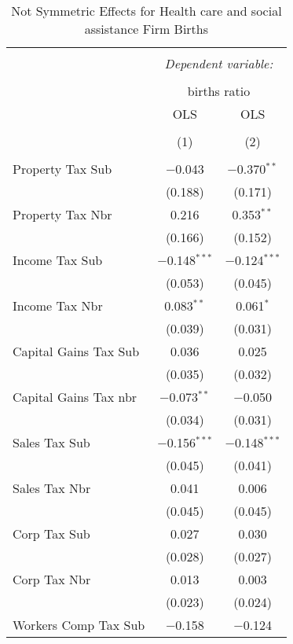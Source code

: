 
\begin{table}[!htbp] \centering 
  \caption{Not Symmetric Effects for  Health care and social assistance Firm Births} 
  \label{62noequality} 
\footnotesize 
\begin{tabular}{@{\extracolsep{5pt}}lcc} 
\\[-1.8ex]\hline 
\hline \\[-1.8ex] 
 & \multicolumn{2}{c}{\textit{Dependent variable:}} \\ 
\cline{2-3} 
\\[-1.8ex] & \multicolumn{2}{c}{births ratio} \\ 
 & OLS & OLS \\ 
\\[-1.8ex] & (1) & (2)\\ 
\hline \\[-1.8ex] 
 Property Tax Sub & $-$0.043 & $-$0.370$^{**}$ \\ 
  & (0.188) & (0.171) \\ 
  Property Tax Nbr & 0.216 & 0.353$^{**}$ \\ 
  & (0.166) & (0.152) \\ 
  Income Tax Sub & $-$0.148$^{***}$ & $-$0.124$^{***}$ \\ 
  & (0.053) & (0.045) \\ 
  Income Tax Nbr & 0.083$^{**}$ & 0.061$^{*}$ \\ 
  & (0.039) & (0.031) \\ 
  Capital Gains Tax Sub & 0.036 & 0.025 \\ 
  & (0.035) & (0.032) \\ 
  Capital Gains Tax nbr & $-$0.073$^{**}$ & $-$0.050 \\ 
  & (0.034) & (0.031) \\ 
  Sales Tax Sub & $-$0.156$^{***}$ & $-$0.148$^{***}$ \\ 
  & (0.045) & (0.041) \\ 
  Sales Tax Nbr & 0.041 & 0.006 \\ 
  & (0.045) & (0.045) \\ 
  Corp Tax Sub & 0.027 & 0.030 \\ 
  & (0.028) & (0.027) \\ 
  Corp Tax Nbr & 0.013 & 0.003 \\ 
  & (0.023) & (0.024) \\ 
  Workers Comp Tax Sub & $-$0.158 & $-$0.124 \\ 

\end{tabular}
\end{table}
